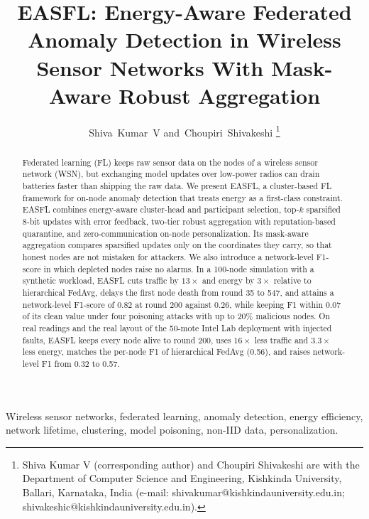 \documentclass[journal]{IEEEtran}
\begin{document}
\title{EASFL: Energy-Aware Federated Anomaly Detection in Wireless Sensor Networks With Mask-Aware Robust Aggregation}

\author{Shiva~Kumar~V
and~Choupiri~Shivakeshi
\thanks{Shiva Kumar V (corresponding author) and Choupiri Shivakeshi are with the Department of Computer Science and Engineering, Kishkinda University, Ballari, Karnataka, India (e-mail: shivakumar@kishkindauniversity.edu.in; shivakeshic@kishkindauniversity.edu.in).}}


\maketitle

\begin{abstract}
Federated learning (FL) keeps raw sensor data on the nodes of a wireless sensor network (WSN), but exchanging model updates over low-power radios can drain batteries faster than shipping the raw data. We present EASFL, a cluster-based FL framework for on-node anomaly detection that treats energy as a first-class constraint. EASFL combines energy-aware cluster-head and participant selection, top-$k$ sparsified 8-bit updates with error feedback, two-tier robust aggregation with reputation-based quarantine, and zero-communication on-node personalization. Its mask-aware aggregation compares sparsified updates only on the coordinates they carry, so that honest nodes are not mistaken for attackers. We also introduce a network-level F1-score in which depleted nodes raise no alarms. In a 100-node simulation with a synthetic workload, EASFL cuts traffic by $13\times$ and energy by $3\times$ relative to hierarchical FedAvg, delays the first node death from round 35 to 547, and attains a network-level F1-score of 0.82 at round 200 against 0.26, while keeping F1 within 0.07 of its clean value under four poisoning attacks with up to 20\% malicious nodes. On real readings and the real layout of the 50-mote Intel Lab deployment with injected faults, EASFL keeps every node alive to round 200, uses $16\times$ less traffic and $3.3\times$ less energy, matches the per-node F1 of hierarchical FedAvg (0.56), and raises network-level F1 from 0.32 to 0.57.
\end{abstract}

\begin{IEEEkeywords}
Wireless sensor networks, federated learning, anomaly detection, energy efficiency, network lifetime, clustering, model poisoning, non-IID data, personalization.
\end{IEEEkeywords}
\end{document}
